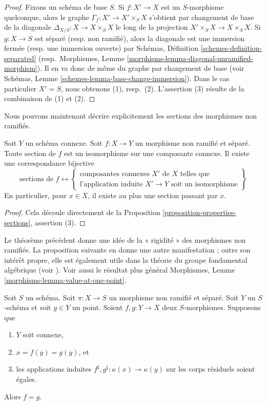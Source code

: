 \begin{proof}
Fixons un schéma de base $S$.
Si $f : X' \to X$ est un $S$-morphisme quelconque, alors le graphe
$\Gamma_f : X' \to X' \times_S X$
s'obtient par changement de base de la diagonale
$\Delta_{X/S} : X \to X \times_S X$ le long de la projection
$X' \times_S X \to X \times_S X$.
Si $g : X \to S$ est séparé (resp. non ramifié),
alors la diagonale est une immersion fermée (resp. une immersion ouverte)
par Schémas, Définition \ref{schemes-definition-separated}
(resp.\ Morphismes, Lemme \ref{morphisms-lemma-diagonal-unramified-morphism}).
Il en va donc de même du graphe par changement de base (voir
Schémas, Lemme \ref{schemes-lemma-base-change-immersion}).
Dans le cas particulier $X' = S$, nous obtenons (1), resp.\ (2).
L'assertion (3) résulte de la combinaison de (1) et (2).
\end{proof}

\noindent
Nous pouvons maintenant décrire explicitement les sections des morphismes non ramifiés.

\begin{theorem}
\label{theorem-sections-unramified-maps}
Soit $Y$ un schéma connexe.
Soit $f : X \to Y$ un morphisme non ramifié et séparé.
Toute section de $f$ est un isomorphisme sur une composante connexe.
Il existe une correspondance bijective
$$
\text{sections de }f
\leftrightarrow
\left\{
\begin{matrix}
\text{composantes connexes }X'\text{ de }X\text{ telles que}\\
\text{l'application induite }X' \to Y\text{ soit un isomorphisme}
\end{matrix}
\right\}
$$
En particulier, pour $x \in X$, il existe au plus une
section passant par $x$.
\end{theorem}

\begin{proof}
Cela découle directement de la Proposition \ref{proposition-properties-sections}, assertion (3).
\end{proof}

\noindent
Le théorème précédent donne une idée de la « rigidité » des morphismes non ramifiés.
La proposition suivante en donne une autre manifestation ;
outre son intérêt propre, elle est également utile dans la
théorie du groupe fondamental algébrique (voir \cite[Expos\'e V]{SGA1}).
Voir aussi le résultat plus général
Morphismes, Lemme \ref{morphisms-lemma-value-at-one-point}.

\begin{proposition}
\label{proposition-equality}
Soit $S$ un schéma.
Soit $\pi : X \to S$ un morphisme non ramifié et séparé.
Soit $Y$ un $S$-schéma et soit $y \in Y$ un point.
Soient $f, g : Y \to X$ deux $S$-morphismes. Supposons que
\begin{enumerate}
\item $Y$ soit connexe,
\item $x = f(y) = g(y)$, et
\item les applications induites $f^\sharp, g^\sharp : \kappa(x) \to \kappa(y)$
sur les corps résiduels soient égales.
\end{enumerate}
Alors $f = g$.
\end{proposition}

